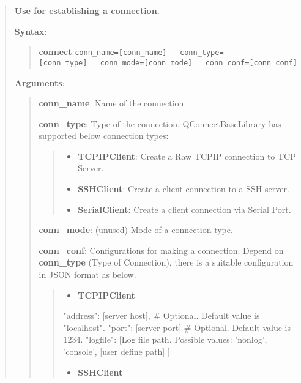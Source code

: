 \begin{quote}
\textbf{Use for establishing a connection.}

\textbf{Syntax}:

\begin{quote}
\textbf{connect}
\texttt{conn\_name={[}conn\_name{]}\ \ \ conn\_type={[}conn\_type{]}\ \ \ conn\_mode={[}conn\_mode{]}\ \ \ conn\_conf={[}conn\_conf{]}}
\end{quote}

\textbf{Arguments}:

\begin{quote}
\textbf{conn\_name}: Name of the connection.

\textbf{conn\_type}: Type of the connection. QConnectBaseLibrary has
supported below connection types:

\begin{quote}
\begin{itemize}
\tightlist
\item
  \textbf{TCPIPClient}: Create a Raw TCPIP connection to TCP Server.
\item
  \textbf{SSHClient}: Create a client connection to a SSH server.
\item
  \textbf{SerialClient}: Create a client connection via Serial Port.
\end{itemize}
\end{quote}

\textbf{conn\_mode}: (unused) Mode of a connection type.

\textbf{conn\_conf}: Configurations for making a connection. Depend on
\textbf{conn\_type} (Type of Connection), there is a suitable
configuration in JSON format as below.

\begin{quote}
\begin{itemize}
\tightlist
\item
  \textbf{TCPIPClient}
\end{itemize}


\begin{robotcode}
{
    "address": [server host], # Optional. Default value is "localhost".
    "port": [server port]     # Optional. Default value is 1234.
    "logfile": [Log file path. Possible values: 'nonlog', 'console', [user define path] ]
 }
\end{robotcode}


\begin{itemize}
\tightlist
\item
  \textbf{SSHClient}
\end{itemize}



\end{quote}
\end{quote}
\end{quote}
